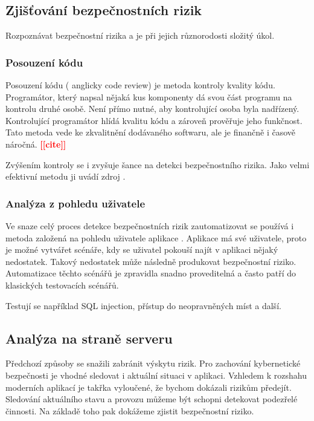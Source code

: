 \documentclass[thesis=M,czech]{FITthesis}[2012/10/20]
\newcommand{\todo}[1]{\textcolor{red}{\textbf{[[#1]]}}}
\begin{document}
		\subsection{Zjišťování bezpečnostních rizik}
			Rozpoznávat bezpečnostní rizika a je při jejich různorodosti složitý úkol. 
			
			\subsubsection{Posouzení kódu}
				Posouzení kódu ( anglicky code review) je metoda kontroly kvality kódu. Programátor, který napsal nějaká kus komponenty dá svou část programu na kontrolu druhé osobě. Není přímo nutné, aby kontrolující osoba byla nadřízený. Kontrolující programátor hlídá kvalitu kódu a zároveň prověřuje jeho funkčnost. Tato metoda vede ke zkvalitnění dodávaného softwaru, ale je finančně i časově náročná. \todo{cite}
			
			Zvýšením kontroly se i zvyšuje šance na detekci bezpečnostního rizika. Jako velmi efektivní metodu ji uvádí zdroj \cite{pethukovKozlovVulnerabilities}.
			
			\subsubsection{Analýza z pohledu uživatele}
				Ve snaze celý proces detekce bezpečnostních rizik zautomatizovat se používá i metoda založená na pohledu uživatele aplikace \cite{pethukovKozlovVulnerabilities}. Aplikace má své uživatele, proto je možné vytvářet scénáře, kdy se uživatel pokouší najít v aplikaci nějaký nedostatek. Takový nedostatek může následně produkovat bezpečnostní riziko. Automatizace těchto scénářů je zpravidla snadno proveditelná a často patří do klasických testovacích scénářů.
				
				Testují se například SQL injection, přístup do neopravněných míst a další.
				
			\subsection{Analýza na straně serveru}
				Předchozí způsoby se snažili zabránit výskytu rizik. Pro zachování kybernetické bezpečnosti je vhodné sledovat i aktuální situaci v aplikaci. Vzhledem k rozshahu moderních aplikací je takřka vyloučené, že bychom dokázali rizikům předejít. Sledování aktuálního stavu a provozu můžeme být schopni detekovat podezřelé činnosti. Na základě toho pak dokážeme zjistit bezpečnostní riziko.
				
\end{document}
